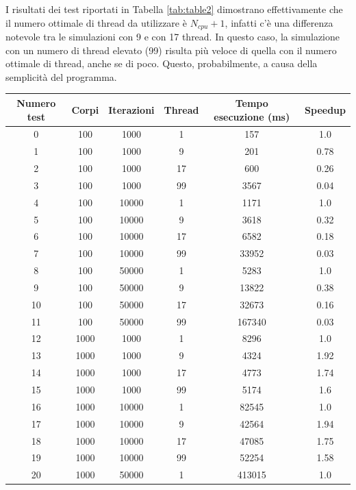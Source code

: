 \documentclass[12pt,a4paper,openright,twoside]{book}
\begin{document}
I risultati dei test riportati in Tabella \ref{tab:table2} dimostrano effettivamente che
il numero ottimale di thread da utilizzare è $N_{cpu} + 1$, infatti c'è una differenza notevole tra le simulazioni con 9 e con 17 thread. 
In questo caso, la simulazione con un numero di thread elevato (99) risulta più veloce di quella con il numero ottimale di thread, anche se di poco.
Questo, probabilmente, a causa della semplicità del programma.

\begin{table}[h!]
	\centering
	\begin{tabular}{ |c|c|c|c|c|c| } 
		\hline
		Numero test & Corpi & Iterazioni & Thread & Tempo esecuzione (ms) & Speedup \\
		\hline
		0 & 100 & 1000 & 1 & 157 & 1.0 \\ 
		\hline
		1 & 100 & 1000 & 9 & 201 & 0.78 \\ 
		\hline
		2 & 100 & 1000 & 17 & 600 & 0.26 \\ 
		\hline
		3 & 100 & 1000 & 99 & 3567 & 0.04 \\ 
		\hline
		4 & 100 & 10000 & 1 & 1171 & 1.0 \\ 
		\hline
		5 & 100 & 10000 & 9 & 3618 & 0.32 \\ 
		\hline
		6 & 100 & 10000 & 17 & 6582 & 0.18 \\ 
		\hline
		7 & 100 & 10000 & 99 & 33952 & 0.03 \\ 
		\hline
		8 & 100 & 50000 & 1 & 5283 & 1.0 \\ 
		\hline
		9 & 100 & 50000 & 9 & 13822 & 0.38 \\ 
		\hline
		10 & 100 & 50000 & 17 & 32673 & 0.16 \\ 
		\hline
		11 & 100 & 50000 & 99 & 167340 & 0.03 \\ 
		\hline
		12 & 1000 & 1000 & 1 & 8296 & 1.0 \\ 
		\hline
		13 & 1000 & 1000 & 9 & 4324 & 1.92 \\ 
		\hline
		14 & 1000 & 1000 & 17 & 4773 & 1.74 \\ 
		\hline
		15 & 1000 & 1000 & 99 & 5174 & 1.6 \\ 
		\hline
		16 & 1000 & 10000 & 1 & 82545 & 1.0 \\ 
		\hline
		17 & 1000 & 10000 & 9 & 42564 & 1.94 \\ 
		\hline
		18 & 1000 & 10000 & 17 & 47085 & 1.75 \\ 
		\hline
		19 & 1000 & 10000 & 99 & 52254 & 1.58 \\ 
		\hline
		20 & 1000 & 50000 & 1 & 413015 & 1.0 \\ 

\end{tabular}
\end{table}
\end{document}
